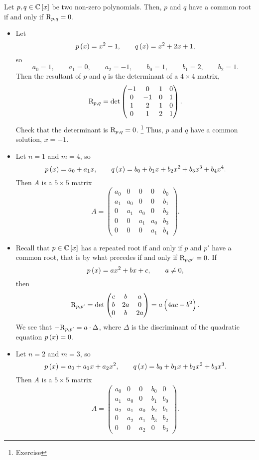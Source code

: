\begin{theorem}
\label{thm:9.3}
Let $ p, q \in \CC\sbr{x} $ be two non-zero polynomials. Then, $ p $ and $ q $ have a common root if and only if $ \mathrm{R}_{p, q} = 0 $.
\end{theorem}

\begin{example}
\hfill
\begin{itemize}
\item Let
$$ p\br{x} = x^2 - 1, \qquad q\br{x} = x^2 + 2x + 1, $$
so
$$ a_0 = 1, \qquad a_1 = 0, \qquad a_2 = -1, \qquad b_0 = 1, \qquad b_1 = 2, \qquad b_2 = 1. $$
Then the resultant of $ p $ and $ q $ is the determinant of a $ 4 \times 4 $ matrix,
$$ \mathrm{R}_{p, q} = \det
\begin{pmatrix}
-1 & 0 & 1 & 0 \\
0 & -1 & 0 & 1 \\
1 & 2 & 1 & 0 \\
0 & 1 & 2 & 1
\end{pmatrix}.
$$
Check that the determinant is $ \mathrm{R}_{p, q} = 0 $. \footnote{Exercise} Thus, $ p $ and $ q $ have a common solution, $ x = -1 $.

\pagebreak

\item Let $ n = 1 $ and $ m = 4 $, so
$$ p\br{x} = a_0 + a_1x, \qquad q\br{x} = b_0 + b_1x + b_2x^2 + b_3x^3 + b_4x^4. $$
Then $ A $ is a $ 5 \times 5 $ matrix
$$ A =
\begin{pmatrix}
a_0 & 0 & 0 & 0 & b_0 \\
a_1 & a_0 & 0 & 0 & b_1 \\
0 & a_1 & a_0 & 0 & b_2 \\
0 & 0 & a_1 & a_0 & b_3 \\
0 & 0 & 0 & a_1 & b_4
\end{pmatrix}.
$$
\item Recall that $ p \in \CC\sbr{x} $ has a repeated root if and only if $ p $ and $ p' $ have a common root, that is by what precedes if and only if $ \mathrm{R}_{p, p'} = 0 $. If
$$ p\br{x} = ax^2 + bx + c, \qquad a \ne 0, $$
then
$$ \R_{p, p'} = \det \threebythree{c}{b}{a}{b}{2a}{0}{0}{b}{2a} = a\br{4ac - b^2}. $$
We see that $ -\mathrm{R}_{p, p'} = a \cdot \Delta $, where $ \Delta $ is the discriminant of the quadratic equation $ p\br{x} = 0 $.
\item Let $ n = 2 $ and $ m = 3 $, so
$$ p\br{x} = a_0 + a_1x + a_2x^2, \qquad q\br{x} = b_0 + b_1x + b_2x^2 + b_3x^3. $$
Then $ A $ is a $ 5 \times 5 $ matrix
$$ A =
\begin{pmatrix}
a_0 & 0 & 0 & b_0 & 0 \\
a_1 & a_0 & 0 & b_1 & b_0 \\
a_2 & a_1 & a_0 & b_2 & b_1 \\
0 & a_2 & a_1 & b_3 & b_2 \\
0 & 0 & a_2 & 0 & b_3
\end{pmatrix}.
$$
\end{itemize}
\end{example}

